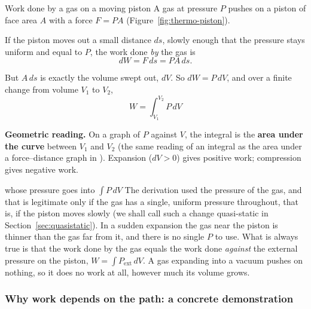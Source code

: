 \begin{derivbox}{Work done by a gas on a moving piston}\label{der:thermo-pdv}
 A gas at pressure $P$ pushes on a piston of face area $A$ with a force $F=PA$
(Figure~\ref{fig:thermo-piston}).

 If the piston moves out a small distance $ds$, slowly enough that the pressure stays uniform
and equal to $P$, the work done \emph{by} the gas is
\[ dW = F\,ds = PA\,ds . \]

 But $A\,ds$ is exactly the volume swept out, $dV$. So $dW=P\,dV$, and over a finite change from
volume $V_1$ to $V_2$,
\[
\boxed{\;W=\int_{V_1}^{V_2} P\,dV\;}
\]

 \textbf{Geometric reading.} On a graph of $P$ against $V$, the integral is the \textbf{area under
the curve} between $V_1$ and $V_2$ (the same reading of an integral as the area under a force--distance
graph in ). Expansion ($dV>0$) gives positive work; compression gives negative work.
\end{derivbox}

\begin{figure}[htbp]
\centering
{}
\end{figure}

\begin{trapbox}{whose pressure goes into $\int P\,dV$}
The derivation used the pressure of the gas, and that is legitimate only if the gas has a single, uniform
pressure throughout, that is, if the piston moves slowly (we shall call such a change quasi-static in
Section~\ref{sec:quasistatic}). In a sudden expansion the gas near the piston is thinner than the gas far
from it, and there is no single $P$ to use. What is always true is that the work done by the gas equals
the work done \emph{against} the external pressure on the piston, $W=\int P_{\text{ext}}\,dV$. A gas
expanding into a vacuum pushes on nothing, so it does no work at all, however much its volume grows.
\end{trapbox}

\subsubsection{Why work depends on the path: a concrete demonstration}

